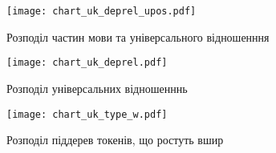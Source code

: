\begin{figure}[ht]
  \begin{center}
    \texttt{[image: chart\_uk\_deprel\_upos.pdf]}
  \end{center}
  \caption{Розподіл частин мови та універсального відношенння}
  \label{img:uk_deprel_upos}
\end{figure}

\newpage

\begin{multicols}{2}
\begin{figure}[H]
  \begin{center}
    \texttt{[image: chart\_uk\_deprel.pdf]}
  \end{center}
  \caption{Розподіл універсальних відношенннь}
  \label{img:uk0}
\end{figure}

\begin{figure}[H]
  \begin{center}
    \texttt{[image: chart\_uk\_type\_w.pdf]}
  \end{center}
  \caption{Розподіл піддерев токенів, що ростуть вшир}
  \label{img:uk3}
\end{figure}




\end{multicols}

